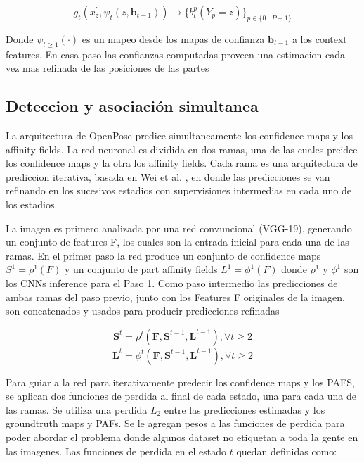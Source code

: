 \documentclass[runningheads]{llncs}
\begin{document}
\begin{equation}
g_t(x_z^{'}, \psi_t(z,\textbf{b}_{t-1})) \rightarrow \{ b_t^p(Y_p = z)  \}_{p \in \{0...P+1 \}}
\end{equation}

Donde $\psi_{t\ge1}(\cdot)$ es un mapeo desde los mapas de confianza $\textbf{b}_{t-1}$ a los context features. En casa paso las confianzas computadas proveen una estimacion cada vez mas refinada de las posiciones de las partes  
\subsection{Deteccion y asociación simultanea}
La arquitectura de OpenPose predice simultaneamente los confidence maps y los affinity fields. La red neuronal es dividida en dos ramas, una de las cuales preidce los confidence maps y la otra los affinity fields. Cada rama es una arquitectura de prediccion iterativa, basada en Wei et al. , en donde las predicciones se van refinando en los sucesivos estadios con supervisiones intermedias en cada uno de los estadios.

La imagen es primero analizada por una red convuncional (VGG-19), generando un conjunto de features F, los cuales son la entrada inicial para cada una de las ramas. En el primer paso la red produce un conjunto de confidence maps $ S^{1} = \rho^{1}(F) $ y un conjunto de part affinity fields $ L^{1} = \phi^{1}(F) $ donde $ \rho^{1} $ y $ \phi^{1} $ son los CNNs inference para el Paso 1. Como paso intermedio las predicciones de ambas ramas del paso previo, junto con los Features F originales de la imagen, son concatenados y usados para producir predicciones refinadas

\begin{equation}
\textbf{S}^t = \rho^t(\textbf{F},\textbf{S}^{t-1},\textbf{L}^{t-1}), \forall t \geq 2
\end{equation}
\begin{equation}
\textbf{L}^t = \phi^t(\textbf{F},\textbf{S}^{t-1},\textbf{L}^{t-1}), \forall t \geq 2
\end{equation}

Para guiar a la red para iterativamente predecir los confidence maps y los PAFS, se aplican dos funciones de perdida al final de cada estado, una para cada una de las ramas. Se utiliza una perdida $L_{2}$ entre las predicciones estimadas y los groundtruth maps y PAFs. Se le agregan pesos a las funciones de perdida para poder abordar el problema donde algunos dataset no etiquetan a toda la gente en las imagenes. Las funciones de perdida en el estado $t$ quedan definidas como:
\end{document}
